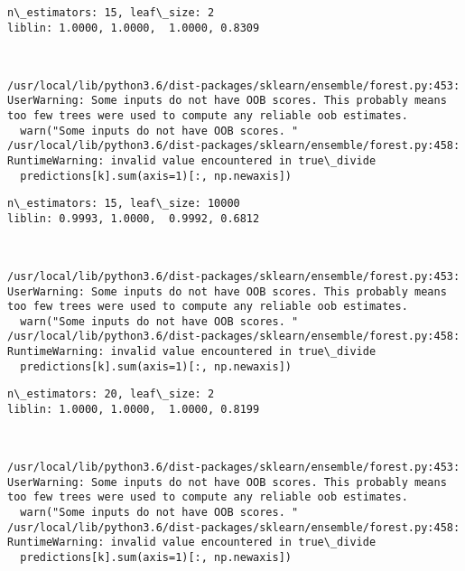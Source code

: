 \documentclass[10pt, t]{beamer}
\begin{document}
    \begin{Verbatim}[commandchars=\\\{\}]
n\_estimators: 15, leaf\_size: 2
liblin: 1.0000, 1.0000,  1.0000, 0.8309 



    \end{Verbatim}

    \begin{Verbatim}[commandchars=\\\{\}]
/usr/local/lib/python3.6/dist-packages/sklearn/ensemble/forest.py:453: UserWarning: Some inputs do not have OOB scores. This probably means too few trees were used to compute any reliable oob estimates.
  warn("Some inputs do not have OOB scores. "
/usr/local/lib/python3.6/dist-packages/sklearn/ensemble/forest.py:458: RuntimeWarning: invalid value encountered in true\_divide
  predictions[k].sum(axis=1)[:, np.newaxis])

    \end{Verbatim}

    \begin{Verbatim}[commandchars=\\\{\}]
n\_estimators: 15, leaf\_size: 10000
liblin: 0.9993, 1.0000,  0.9992, 0.6812 



    \end{Verbatim}

    \begin{Verbatim}[commandchars=\\\{\}]
/usr/local/lib/python3.6/dist-packages/sklearn/ensemble/forest.py:453: UserWarning: Some inputs do not have OOB scores. This probably means too few trees were used to compute any reliable oob estimates.
  warn("Some inputs do not have OOB scores. "
/usr/local/lib/python3.6/dist-packages/sklearn/ensemble/forest.py:458: RuntimeWarning: invalid value encountered in true\_divide
  predictions[k].sum(axis=1)[:, np.newaxis])

    \end{Verbatim}

    \begin{Verbatim}[commandchars=\\\{\}]
n\_estimators: 20, leaf\_size: 2
liblin: 1.0000, 1.0000,  1.0000, 0.8199 



    \end{Verbatim}

    \begin{Verbatim}[commandchars=\\\{\}]
/usr/local/lib/python3.6/dist-packages/sklearn/ensemble/forest.py:453: UserWarning: Some inputs do not have OOB scores. This probably means too few trees were used to compute any reliable oob estimates.
  warn("Some inputs do not have OOB scores. "
/usr/local/lib/python3.6/dist-packages/sklearn/ensemble/forest.py:458: RuntimeWarning: invalid value encountered in true\_divide
  predictions[k].sum(axis=1)[:, np.newaxis])

    \end{Verbatim}
\end{document}
